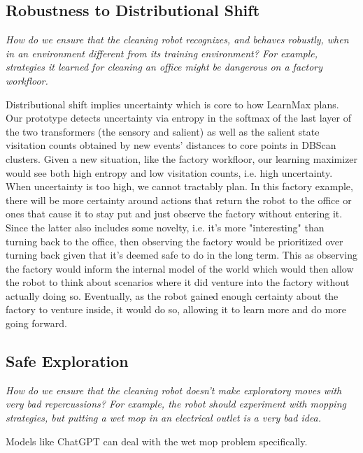 \documentclass{article}
\begin{document}
\subsection{Robustness to Distributional Shift}
\textit{How do we ensure that the cleaning robot recognizes,
and behaves robustly, when in an environment different from its training environment? For example, strategies it learned for cleaning an office might be dangerous on a factory workfloor.}

\hspace{1pt}

Distributional shift implies uncertainty which is core to how LearnMax plans. Our prototype detects uncertainty via entropy in the softmax of the last layer of the two transformers (the sensory and salient) as well as the salient state visitation counts obtained by new events' distances to core points in DBScan clusters. Given a new situation, like the factory workfloor, our learning maximizer would see both high entropy and low visitation counts, i.e. high uncertainty. When uncertainty is too high, we cannot tractably plan. In this factory example, there will be more certainty around actions that return the robot to the office or ones that cause it to stay put and just observe the factory without entering it. Since the latter also includes some novelty, i.e. it's more "interesting" than turning back to the office, then observing the factory would be prioritized over turning back given that it's deemed safe to do in the long term. This as observing the factory would inform the internal model of the world which would then allow the robot to think about scenarios where it did venture into the factory without actually doing so. \cite{jang2023reflection} Eventually, as the robot gained enough certainty about the factory to venture inside, it would do so, allowing it to learn more and do more going forward.

\subsection{Safe Exploration}
\textit{How do we ensure that the cleaning robot doesn’t make exploratory
moves with very bad repercussions? For example, the robot should experiment with mopping strategies, but putting a wet mop in an electrical outlet is a very bad idea.}

\hspace{1pt}

Models like ChatGPT can deal with the wet mop problem specifically.
\end{document}
